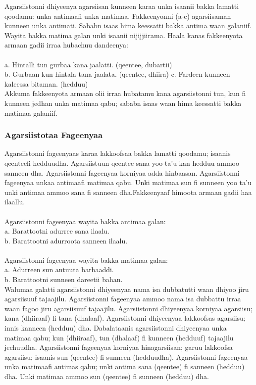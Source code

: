 \documentclass[11pt,b5paper]{book}
\begin{document}
Agarsiistonni dhiyeenya agarsiisan kunneen karaa unka isaanii bakka lamatti qoodamu: unka antimaafi unka matimaa.
Fakkeenyonni (a-c) agarsiisaman kunneen unka antimati. Sababn isaas hima keessatti bakka antima waan galaniif.
Wayita bakka matima galan unki isaanii nijijjiirama. Haala kanas fakkeenyota armaan gadii irraa hubachuu dandeenya: \\
\\
a. Hintalli tun gurbaa kana jaalatti. (qeentee, dubartii)\\
b. Gurbaan kun hintala tana jaalata. (qeentee, dhiira)
c. Fardeen kunneen kaleessa bitaman. (hedduu)\\

Akkuma fakkeenyota armaan olii irraa hubatamu kana agarsiistonni tun, kun fi kunneen jedhan unka matimaa qabu;
sababn isaas waan hima keessatti bakka matimaa galaniif. 

\subsubsection{ Agarsiistotaa Fageenyaa}

Agarsiistonni fageenyaas karaa lakkoofsaa bakka lamatti qoodamu; isaanis qeenteefi hedduudha. Agarsiistuun qeentee
sana yoo ta'u kan hedduu ammoo sanneen dha. Agarsiistonni fageenyaa korniyaa adda hinbaasan. Agarsiistonni fageenyaa unkaa antimaafi matimaa qabu. Unki matimaa sun fi sunneen yoo ta'u unki antimaa ammoo sana fi sanneen dha.Fakkeenyaaf himoota armaan gadii haa ilaallu.\\
\\
Agarsiistonni fageenyaa wayita bakka antimaa galan:\\
a. Barattootni adurree sana ilaalu.\\
b. Barattootni adurroota sanneen ilaalu.\\
\\
Agarsiistonni fageenyaa wayita bakka matimaa galan:\\
a. Adurreen sun antuuta barbaaddi.\\
b. Barattootni sunneen dareetii bahan. \\

Walumaa galatti agarsiistonni dhiyeenyaa nama isa dubbatutti waan dhiyoo jiru agarsiisuuf tajaajilu. Agarsiistonni fageenyaa ammoo nama isa dubbattu irraa waan fagoo jiru agarsiisuuf tajaajilu. Agarsiistonni dhiyeenyaa korniyaa agarsiisu; kana (dhiiraaf) fi tana (dhalaaf). Agarsiistonni dhiyeenyaa lakkoofsas agarsiisu; innis kanneen (hedduu) dha. Dabalataanis agarsiistonni dhiyeenyaa unka matimaa qabu; kun (dhiiraaf), tun (dhalaaf) fi kunneen (hedduuf) tajaajilu jechuudha. Agarsiistonni fageenyaa korniyaa hinagarsiisan; garuu lakkoofsa agarsiisu; isaanis sun (qeentee) fi sunneen (hedduudha). Agarsiistonni fageenyaa unka matimaafi antimas qabu; unki antima sana (qeentee) fi sanneen (hedduu) dha. Unki matimaa ammoo sun (qeentee) fi sunneen (hedduu) dha.
\end{document}
